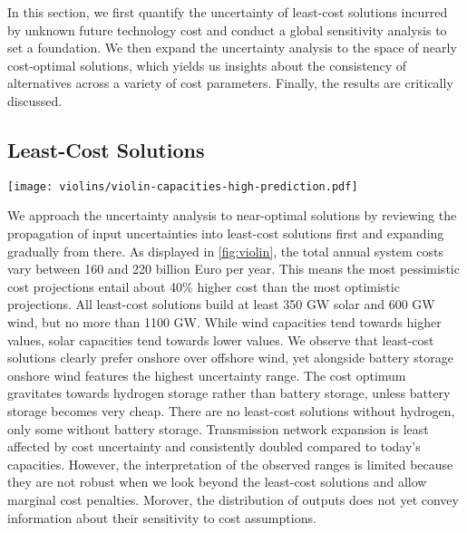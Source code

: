 In this section, we first quantify the uncertainty of least-cost solutions incurred by unknown
future technology cost
and conduct a global sensitivity analysis to set a foundation.
We then expand the uncertainty analysis to the space of nearly cost-optimal solutions,
which yields us insights about the consistency of alternatives across a variety of cost parameters.
Finally, the results are critically discussed.

\subsection{Least-Cost Solutions}

\begin{SCfigure}
    \texttt{[image: violins/violin-capacities-high-prediction.pdf]}
    \caption{
      Distribution of total system cost, generation, storage, and transmission capacities
      for least-cost solutions.
    }
    \label{fig:violin}
\end{SCfigure}

We approach the uncertainty analysis to near-optimal solutions
by reviewing the propagation of input uncertainties into 
least-cost solutions first and expanding gradually from there.
As displayed in \cref{fig:violin},
the total annual system costs vary between 160 and 220 billion Euro per year.
This means the most pessimistic cost projections
entail about 40\% higher cost than the most optimistic projections.
All least-cost solutions build at least 350 GW solar and 600 GW wind, but no more than 1100 GW.
While wind capacities tend towards higher values, solar capacities tend towards lower values.
We observe that least-cost solutions clearly prefer onshore over offshore wind, yet
alongside battery storage onshore wind features the highest uncertainty range.
The cost optimum gravitates towards hydrogen storage rather than battery storage,
unless battery storage becomes very cheap.
There are no least-cost solutions without hydrogen, only some without battery storage.
Transmission network expansion is least affected by cost uncertainty and consistently
doubled compared to today's capacities.
However, the interpretation of the observed ranges is limited because
they are not robust when we look beyond the least-cost solutions and allow marginal cost penalties.
Morover, the distribution of outputs does not yet convey information about their sensitivity to cost assumptions. 



